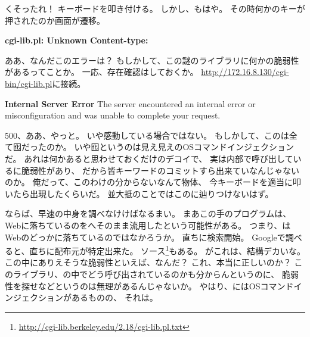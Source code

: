 くそったれ！
キーボードを叩き付ける。
しかし、もはや。
その時何かのキーが押されたのか画面が遷移。

\begin{screen}
\textbf{cgi-lib.pl: Unknown Content-type: }
\end{screen}

ああ、なんだこのエラーは？
もしかして、この謎のライブラリに何かの脆弱性があるってことか。
一応、存在確認はしておくか。
\url{http://172.16.8.130/cgi-bin/cgi-lib.pl}に接続。

\begin{itembox}[c]{\textbf{Internal Server Error}}
The server encountered an internal error or misconfiguration and 
was unable to complete your request.
\end{itembox}

500、ああ、やっと。
いや感動している場合ではない。
もしかして、このは全て囮だったのか。
いや囮というのは見え見えのOSコマンドインジェクションだ。
あれは何かあると思わせておくだけのデコイで、
実は内部で呼び出しているに脆弱性があり、
だから皆キーワードのコミットすら出来ていなんじゃないのか。
俺だって、このわけの分からないなんて物体、
今キーボードを適当に叩いたら出現したくらいだ。
並大抵のことではこのに辿りつけないはず。

ならば、早速の中身を調べなけけばなるまい。
まあこの手のプログラムは、
Webに落ちているのをへそのまま流用したという可能性がある。
つまり、はWebのどっかに落ちているのではなかろうか。
直ちに検索開始。
Googleで調べると、直ちに配布元が特定出来た。
ソース\footnote{\url{http://cgi-lib.berkeley.edu/2.18/cgi-lib.pl.txt}}もある。
がこれは、結構デカいな。
この中にありえそうな脆弱性といえば、なんだ？
これ、本当に正しいのか？
このライブラリ、の中でどう呼び出されているのかも分からんというのに、
脆弱性を探せなどというのは無理があるんじゃないか。
やはり、にはOSコマンドインジェクションがあるものの、
それは。

